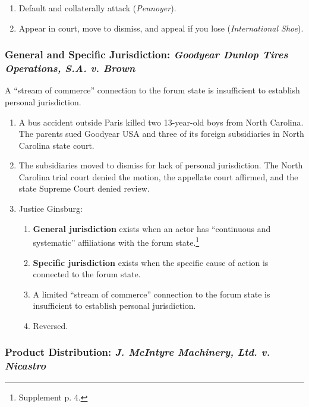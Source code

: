 \begin{enumerate}
    \item Default and collaterally attack (\emph{Pennoyer}).
    \item Appear in court, move to dismiss, and appeal if you lose 
    (\emph{International Shoe}).
\end{enumerate}

\subsubsection{General and Specific Jurisdiction: \emph{Goodyear Dunlop Tires 
Operations, S.A. v. Brown}} %
 
A ``stream of commerce'' connection to the forum state is insufficient to 
establish personal jurisdiction.

\begin{enumerate}
    \item A bus accident outside Paris killed two 13-year-old boys from North 
    Carolina. The parents sued Goodyear USA and three of its foreign 
    subsidiaries in North Carolina state court.
    \item The subsidiaries moved to dismiss for lack of personal jurisdiction. The North Carolina 
    trial court denied the motion, the appellate court affirmed, and the state 
    Supreme Court denied review.
    \item Justice Ginsburg:
    \begin{enumerate}
        \item \textbf{General jurisdiction} exists when an actor has 
        ``continuous and systematic'' affiliations with the forum 
        state.\footnote{Supplement p. 4.}
        \item \textbf{Specific jurisdiction} exists when the specific cause of 
        action is connected to the forum state.
        \item A limited ``stream of commerce'' connection to the forum state 
        is insufficient to establish personal jurisdiction.
        \item Reversed.
    \end{enumerate}
\end{enumerate}

\subsubsection{Product Distribution: \emph{J. McIntyre Machinery, Ltd. v. Nicastro}}


